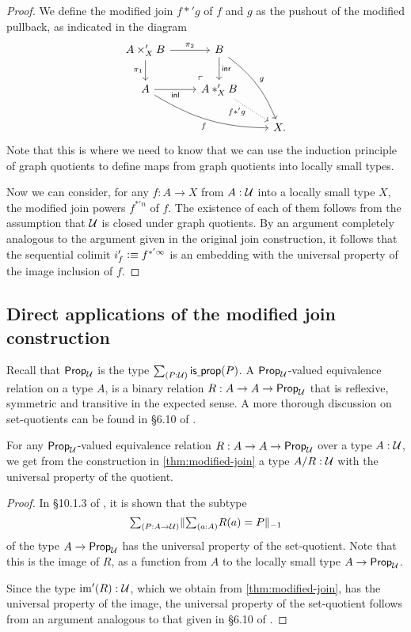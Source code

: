 \begin{proof}
We define the modified join $f \ast' g$ of $f$ and $g$ as the pushout of the
modified pullback, as indicated in the diagram
\begin{equation*}
\begin{tikzcd}
A\times_X' B \arrow[r,"\pi_2"] \arrow[d,swap,"\pi_1"] \arrow[dr, phantom, "{\ulcorner}", at end] & B \arrow[d,"\inr"] \arrow[ddr,bend left=15,"g"] \\
A \arrow[r,swap,"\inl"] \arrow[drr,bend right=15,swap,"f"] & A\ast_X' B \arrow[dr,densely dotted,swap,near start,"{f \ast' g}" xshift=1ex] \\
& & X.
\end{tikzcd}
\end{equation*}
Note that this is where we need to know that we can use the induction principle
of graph quotients to define maps from graph quotients into locally small types.

Now we can consider, for any $f:A\to X$ from $A:\mathcal{U}$ into a locally small type
$X$, the modified join powers $f^{\ast'n}$ of $f$. The existence of each of
them follows from the assumption that $\mathcal{U}$ is closed under graph quotients.
By an argument completely analogous to the argument given in the original join
construction, it follows that the sequential colimit
$i'_f\vcentcolon\equiv f^{\ast'\infty}$ is an embedding with the universal property of the image 
inclusion of $f$. 
\end{proof}

\subsection{Direct applications of the modified join construction}

Recall that $\mathsf{Prop}_{\mathcal{U}}$ is the type $\sm{P:\UU}\isprop(P)$. A $\mathsf{Prop}_{\mathcal{U}}$-valued
equivalence relation on a type $A$, is a binary relation $R:A\to A\to\mathsf{Prop}_{\mathcal{U}}$
that is reflexive, symmetric and transitive in the expected sense.
A more thorough discussion on set-quotients can be found in \S 6.10 of
\cite{hottbook}.

\begin{cor}\label{cor:setquotients}
For any $\mathsf{Prop}_{\mathcal{U}}$-valued equivalence relation $R:A\to A\to\mathsf{Prop}_{\mathcal{U}}$ over a type
$A:\mathcal{U}$, we get from the construction in \autoref{thm:modified-join} a type $A/R:\mathcal{U}$
with the universal property of the quotient.
\end{cor}

\begin{proof}
In \S 10.1.3 of \cite{hottbook}, it is shown that the subtype 
\begin{equation*}
\sm{P:A\to\UU} \trunc{-1}{\sm{a:A} R(a)=P}
\end{equation*} 
of the type $A\to\mathsf{Prop}_{\mathcal{U}}$ has the universal property of the set-quotient.
Note that this is the image of $R$, as a function from $A$ to the locally small
type $A\to\mathsf{Prop}_{\mathcal{U}}$. 

Since the type $\operatorname{im}'(R):\mathcal{U}$, which we obtain from \autoref{thm:modified-join},
has the universal property of the image, the universal property of the
set-quotient follows from an argument analogous to that given in \S 6.10 of \cite{hottbook}.
\end{proof}

